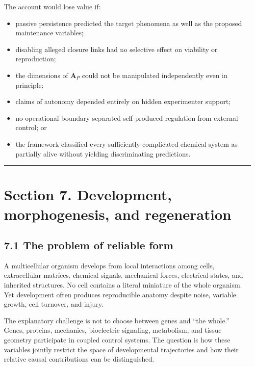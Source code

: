 \documentclass[
  11pt,
]{article}
\providecommand{\tightlist}{%
  \setlength{\itemsep}{0pt}\setlength{\parskip}{0pt}}
\begin{document}
The account would lose value if:

\begin{itemize}
\tightlist
\item
  passive persistence predicted the target phenomena as well as the
  proposed maintenance variables;
\item
  disabling alleged closure links had no selective effect on viability
  or reproduction;
\item
  the dimensions of \(\mathbf A_P\) could not be manipulated
  independently even in principle;
\item
  claims of autonomy depended entirely on hidden experimenter support;
\item
  no operational boundary separated self-produced regulation from
  external control; or
\item
  the framework classified every sufficiently complicated chemical
  system as partially alive without yielding discriminating predictions.
\end{itemize}

\begin{center}\rule{0.5\linewidth}{0.5pt}\end{center}

\section{Section 7. Development, morphogenesis, and
regeneration}\label{section-7.-development-morphogenesis-and-regeneration}

\subsection{7.1 The problem of reliable
form}\label{the-problem-of-reliable-form}

A multicellular organism develops from local interactions among cells,
extracellular matrices, chemical signals, mechanical forces, electrical
states, and inherited structures. No cell contains a literal miniature
of the whole organism. Yet development often produces reproducible
anatomy despite noise, variable growth, cell turnover, and injury.

The explanatory challenge is not to choose between genes and ``the
whole.'' Genes, proteins, mechanics, bioelectric signaling, metabolism,
and tissue geometry participate in coupled control systems. The question
is how these variables jointly restrict the space of developmental
trajectories and how their relative causal contributions can be
distinguished.
\end{document}
